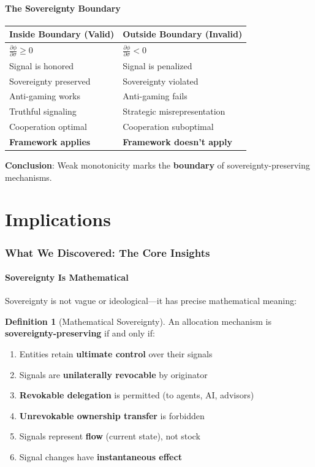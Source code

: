 \documentclass[11pt,a4paper]{article}
\theoremstyle{definition}
\newtheorem{definition}[theorem]{Definition}
\theoremstyle{remark}
\begin{document}
\subsection{The Sovereignty Boundary}

\begin{center}
\begin{tabular}{ll}
\toprule
\textbf{Inside Boundary (Valid)} & \textbf{Outside Boundary (Invalid)} \\
\midrule
$\frac{\partial \phi}{\partial \sigma} \ge 0$ & $\frac{\partial \phi}{\partial \sigma} < 0$ \\
Signal is honored & Signal is penalized \\
Sovereignty preserved & Sovereignty violated \\
Anti-gaming works & Anti-gaming fails \\
Truthful signaling & Strategic misrepresentation \\
Cooperation optimal & Cooperation suboptimal \\
\midrule
\textbf{Framework applies} & \textbf{Framework doesn't apply} \\
\bottomrule
\end{tabular}
\end{center}

\textbf{Conclusion}: Weak monotonicity marks the \textbf{boundary} of sovereignty-preserving mechanisms.

\part{Implications}

\section{What We Discovered: The Core Insights}

\subsection{Sovereignty Is Mathematical}

Sovereignty is not vague or ideological—it has precise mathematical meaning:

\begin{definition}[Mathematical Sovereignty]
An allocation mechanism is \textbf{sovereignty-preserving} if and only if:
\begin{enumerate}
\item Entities retain \textbf{ultimate control} over their signals
\item Signals are \textbf{unilaterally revocable} by originator
\item \textbf{Revokable delegation} is permitted (to agents, AI, advisors)
\item \textbf{Unrevokable ownership transfer} is forbidden
\item Signals represent \textbf{flow} (current state), not stock
\item Signal changes have \textbf{instantaneous effect}
\end{enumerate}
\end{definition}
\end{document}
